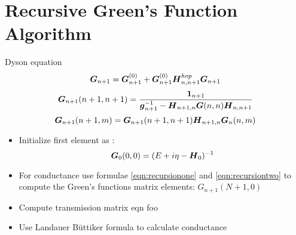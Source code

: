 
\author{Jonas Siegl}


\section{Recursive Green's Function Algorithm}

Dyson equation
\begin{equation}
	\boldsymbol{G}_{n+1} = \boldsymbol{G}^{(0)}_{n+1} + \boldsymbol{G}^{(0)}_{n+1}\boldsymbol{H}^{hop}_{n,n+1}\boldsymbol{G}_{n+1}
	\label{eqn:dyson}
\end{equation} 
\begin{equation}
	\boldsymbol{G}_{n+1}(n+1,n+1) = \frac{\boldsymbol{1}_{n+1}}{\boldsymbol{g}^{-1}_{n+1}-\boldsymbol{H}_{n+1,n}\boldsymbol{G}(n,n)\boldsymbol{H}_{n,n+1}}
	\label{eqn:recursionone}
\end{equation}
\begin{equation}
	\boldsymbol{G}_{n+1}(n+1,m) = \boldsymbol{G}_{n+1}(n+1,n+1)\boldsymbol{H}_{n+1,n}\boldsymbol{G}_{n}(n,m)
	\label{eqn:recursiontwo}
\end{equation}

\begin{itemize}
	\item Initialize first element as :\begin{equation}
			\boldsymbol{G}_{0}(0,0) = (E+i\eta - \boldsymbol{H}_{0})^{-1}
			\label{eqn:initrec}
		\end{equation}
	\item For conductance use formulae \ref{eqn:recursionone} and \ref{eqn:recursiontwo} to compute the Green's functions matrix elements: $G_{n+1}(N+1,0)$
	\item Compute transmission matrix eqn foo
	\item Use Landauer B\"uttiker formula to calculate conductance
\end{itemize}

